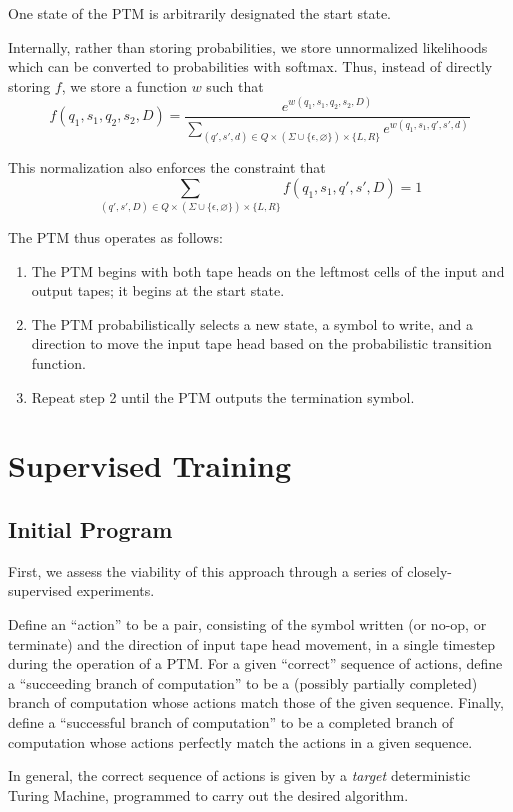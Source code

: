 \documentclass{article}
\begin{document}
One state of the PTM is arbitrarily designated the start state.

Internally, rather than storing probabilities, we store unnormalized likelihoods which can be converted to probabilities with softmax. Thus, instead of directly storing $f$, we store a function $w$ such that
\[ f(q_1, s_1, q_2, s_2, D) = \frac{e^{w(q_1, s_1, q_2, s_2, D)}}{\sum_{(q', s', d) \in Q \times (\Sigma \cup \{\epsilon, \varnothing\}) \times \{L, R\}}e^{w(q_1, s_1, q', s', d)}} \]

This normalization also enforces the constraint that 
\[ \sum_{(q', s', D) \in Q \times (\Sigma \cup \{\epsilon, \varnothing\}) \times \{L, R\}}f(q_1, s_1, q', s', D) = 1\]

The PTM thus operates as follows:
\begin{enumerate}
    \item The PTM begins with both tape heads on the leftmost cells of the input and output tapes; it begins at the start state.
    \item The PTM probabilistically selects a new state, a symbol to write, and a direction to move the input tape head based on the probabilistic transition function. 
    \item Repeat step 2 until the PTM outputs the termination symbol.
\end{enumerate}

\section{Supervised Training}

\subsection{Initial Program}
First, we assess the viability of this approach through a series of closely-supervised experiments.

Define an ``action'' to be a pair, consisting of the symbol written (or no-op, or terminate) and the direction of input tape head movement, in a single timestep during the operation of a PTM. For a given ``correct'' sequence of actions, define a ``succeeding branch of computation'' to be a (possibly partially completed) branch of computation whose actions match those of the given sequence. Finally, define a ``successful branch of computation'' to be a completed branch of computation whose actions perfectly match the actions in a given sequence. 

In general, the correct sequence of actions is given by a \textit{target} deterministic Turing Machine, programmed to carry out the desired algorithm.
\end{document}
